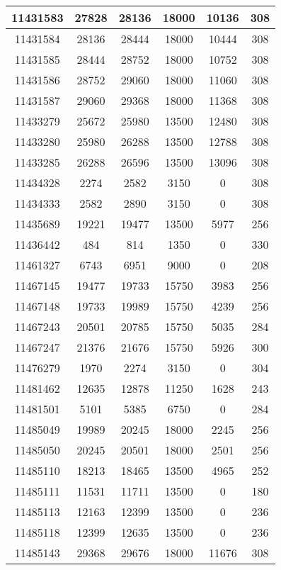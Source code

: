 \begin{appendices}
\begin{center}
\begin{longtable}{|c|c|c|c|c|c|}
11431583 & 27828 & 28136 & 18000 & 10136 & 308 \\ \hline
11431584 & 28136 & 28444 & 18000 & 10444 & 308 \\ \hline
11431585 & 28444 & 28752 & 18000 & 10752 & 308 \\ \hline
11431586 & 28752 & 29060 & 18000 & 11060 & 308 \\ \hline
11431587 & 29060 & 29368 & 18000 & 11368 & 308 \\ \hline
11433279 & 25672 & 25980 & 13500 & 12480 & 308 \\ \hline
11433280 & 25980 & 26288 & 13500 & 12788 & 308 \\ \hline
11433285 & 26288 & 26596 & 13500 & 13096 & 308 \\ \hline
11434328 & 2274  & 2582  & 3150  & 0     & 308 \\ \hline
11434333 & 2582  & 2890  & 3150  & 0     & 308 \\ \hline
11435689 & 19221 & 19477 & 13500 & 5977  & 256 \\ \hline
11436442 & 484   & 814   & 1350  & 0     & 330 \\ \hline
11461327 & 6743  & 6951  & 9000  & 0     & 208 \\ \hline
11467145 & 19477 & 19733 & 15750 & 3983  & 256 \\ \hline
11467148 & 19733 & 19989 & 15750 & 4239  & 256 \\ \hline
11467243 & 20501 & 20785 & 15750 & 5035  & 284 \\ \hline
11467247 & 21376 & 21676 & 15750 & 5926  & 300 \\ \hline
11476279 & 1970  & 2274  & 3150  & 0     & 304 \\ \hline
11481462 & 12635 & 12878 & 11250 & 1628  & 243 \\ \hline
11481501 & 5101  & 5385  & 6750  & 0     & 284 \\ \hline
11485049 & 19989 & 20245 & 18000 & 2245  & 256 \\ \hline
11485050 & 20245 & 20501 & 18000 & 2501  & 256 \\ \hline
11485110 & 18213 & 18465 & 13500 & 4965  & 252 \\ \hline
11485111 & 11531 & 11711 & 13500 & 0     & 180 \\ \hline
11485113 & 12163 & 12399 & 13500 & 0     & 236 \\ \hline
11485118 & 12399 & 12635 & 13500 & 0     & 236 \\ \hline
11485143 & 29368 & 29676 & 18000 & 11676 & 308 \\ \hline

\end{longtable}
\end{center}
\end{appendices}
